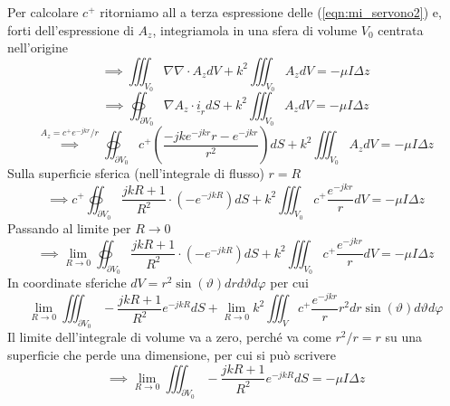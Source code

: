 \documentclass{book}
\begin{document}
            Per calcolare $c^{+}$ ritorniamo all a terza espressione delle (\ref{eqn:mi_servono2}) e, forti dell'espressione di $A_{z}$, integriamola in una sfera di volume $V_{0}$ centrata nell'origine 
            \begin{equation}
                \implies \iiint_{V_{0}} \nabla \nabla \cdot A_{z} dV + k^{2} \iiint_{V_{0}} A_{z}dV = - \mu I \Delta z
            \end{equation}
            \begin{equation}
                \implies \oiint_{\partial V_{0}} \nabla A_{z} \cdot \underline{i}_{r} dS + k^{2} \iiint_{V_{0}}A_{z} dV = -\mu I \Delta z 
            \end{equation}
            \begin{equation}
                \stackrel{A_{z} = c^{+}e^{-jkr}/r}{\implies} \oiint_{\partial V_{0}} c^{+}(\frac{-jke^{-jkr}r - e^{-jkr}}{r ^{2}})dS + k^{2}\iiint_{V_{0}} A_{z} dV = -\mu I \Delta z
            \end{equation}
            Sulla superficie sferica (nell'integrale di flusso) $r=R$
            \begin{equation}
                \implies c^{+} \oiint_{\partial V_{0}} \frac{jkR +1}{R^{2}} \cdot (-e^{-jkR}) dS + k^{2} \iiint_{V_{0}} c^{+} \frac{e^{-jkr}}{r}dV = -\mu I \Delta z
            \end{equation}
            Passando al limite per $R \to 0$
            \begin{equation}
                \implies \lim_{R \to 0} \oiint_{\partial V_{0}} \frac{jkR + 1}{R^{2}} \cdot (-e^{-jkR}) dS + k^{2} \iiint_{V_{0}} c^{+} \frac{e^{-jkr}}{r}dV = - \mu I \Delta z
            \end{equation}
            In coordinate sferiche $dV = r^{2}\sin(\vartheta)drd\vartheta d \varphi$ per cui
            \begin{equation}
                \lim_{R \to 0} \iiint_{\partial V_{0}} - \frac{jkR+1}{R^{2}}e^{-jkR}dS + \lim_{R \to 0} k^{2} \iiint_{V} c^{+} \frac{e^{-jkr}}{r} r^{2} dr \sin(\vartheta) d\vartheta d \varphi
            \end{equation}
            Il limite dell'integrale di volume va a zero, perché va come $r^{2}/r = r$ su una superficie che perde una dimensione, per cui si può scrivere
            \begin{equation}
                \implies \lim_{R \to 0} \iiint_{\partial V_{0}} - \frac{jkR+1}{R^{2}}e^{-jkR}dS = - \mu I \Delta z
            \end{equation}
\end{document}
